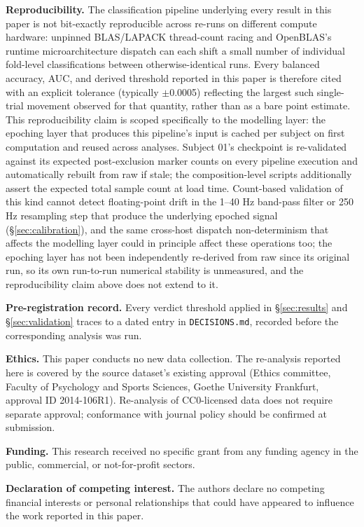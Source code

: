 \documentclass[preprint,12pt]{elsarticle}
\begin{document}
\textbf{Reproducibility.} The classification pipeline underlying every result in this paper is not bit-exactly reproducible across re-runs on different compute hardware: unpinned BLAS/LAPACK thread-count racing and OpenBLAS's runtime microarchitecture dispatch can each shift a small number of individual fold-level classifications between otherwise-identical runs. Every balanced accuracy, AUC, and derived threshold reported in this paper is therefore cited with an explicit tolerance (typically $\pm$0.0005) reflecting the largest such single-trial movement observed for that quantity, rather than as a bare point estimate. This reproducibility claim is scoped specifically to the modelling layer: the epoching layer that produces this pipeline's input is cached per subject on first computation and reused across analyses. Subject 01's checkpoint is re-validated against its expected post-exclusion marker counts on every pipeline execution and automatically rebuilt from raw if stale; the composition-level scripts additionally assert the expected total sample count at load time. Count-based validation of this kind cannot detect floating-point drift in the 1--40 Hz band-pass filter or 250 Hz resampling step that produce the underlying epoched signal (\S\ref{sec:calibration}), and the same cross-host dispatch non-determinism that affects the modelling layer could in principle affect these operations too; the epoching layer has not been independently re-derived from raw since its original run, so its own run-to-run numerical stability is unmeasured, and the reproducibility claim above does not extend to it.

\textbf{Pre-registration record.} Every verdict threshold applied in \S\ref{sec:results} and \S\ref{sec:validation} traces to a dated entry in \texttt{DECISIONS.md}, recorded before the corresponding analysis was run.

\textbf{Ethics.} This paper conducts no new data collection. The re-analysis reported here is covered by the source dataset's existing approval (Ethics committee, Faculty of Psychology and Sports Sciences, Goethe University Frankfurt, approval ID 2014-106R1). Re-analysis of CC0-licensed data does not require separate approval; conformance with journal policy should be confirmed at submission.

\textbf{Funding.} This research received no specific grant from any funding agency in the public, commercial, or not-for-profit sectors.

\textbf{Declaration of competing interest.} The authors declare no competing financial interests or personal relationships that could have appeared to influence the work reported in this paper.
\end{document}
